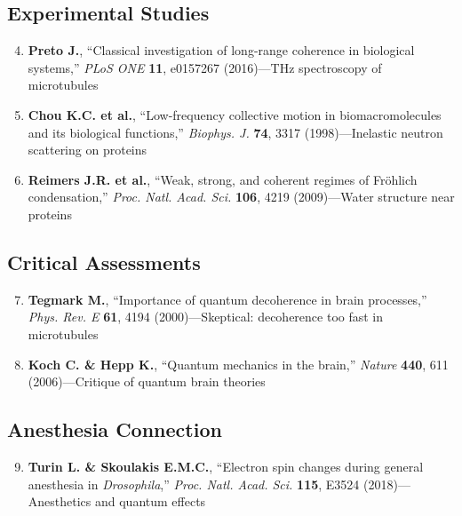 \subsection*{Experimental Studies}

\begin{enumerate}
\setcounter{enumi}{3}
\item \textbf{Preto J.}, ``Classical investigation of long-range coherence in biological systems,'' \emph{PLoS ONE} \textbf{11}, e0157267 (2016)---THz spectroscopy of microtubules
\item \textbf{Chou K.C. et al.}, ``Low-frequency collective motion in biomacromolecules and its biological functions,'' \emph{Biophys. J.} \textbf{74}, 3317 (1998)---Inelastic neutron scattering on proteins
\item
  \textbf{Reimers J.R. et al.}, ``Weak, strong, and coherent regimes of Fröhlich condensation,'' \emph{Proc. Natl. Acad. Sci.} \textbf{106}, 4219 (2009)---Water structure near proteins
\end{enumerate}

\subsection*{Critical Assessments}

\begin{enumerate}
\setcounter{enumi}{6}
\item \textbf{Tegmark M.}, ``Importance of quantum decoherence in brain processes,'' \emph{Phys. Rev. E} \textbf{61}, 4194 (2000)---Skeptical: decoherence too fast in microtubules
\item \textbf{Koch C. \& Hepp K.}, ``Quantum mechanics in the brain,'' \emph{Nature} \textbf{440}, 611 (2006)---Critique of quantum brain theories
\end{enumerate}

\subsection*{Anesthesia Connection}

\begin{enumerate}
\setcounter{enumi}{8}
\item \textbf{Turin L. \& Skoulakis E.M.C.}, ``Electron spin changes during general anesthesia in \emph{Drosophila},'' \emph{Proc. Natl. Acad. Sci.} \textbf{115}, E3524 (2018)---Anesthetics and quantum effects
\end{enumerate}
